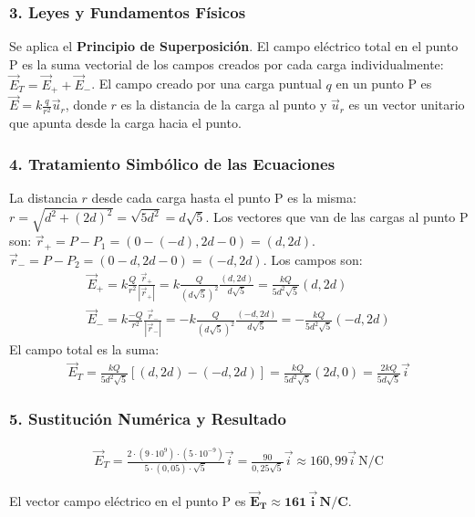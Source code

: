 \subsubsection*{3. Leyes y Fundamentos Físicos}
Se aplica el \textbf{Principio de Superposición}. El campo eléctrico total en el punto P es la suma vectorial de los campos creados por cada carga individualmente: $\vec{E}_T = \vec{E}_+ + \vec{E}_-$.
El campo creado por una carga puntual $q$ en un punto P es $\vec{E} = k \frac{q}{r^2} \vec{u}_r$, donde $r$ es la distancia de la carga al punto y $\vec{u}_r$ es un vector unitario que apunta desde la carga hacia el punto.

\subsubsection*{4. Tratamiento Simbólico de las Ecuaciones}
La distancia $r$ desde cada carga hasta el punto P es la misma: $r = \sqrt{d^2 + (2d)^2} = \sqrt{5d^2} = d\sqrt{5}$.
Los vectores que van de las cargas al punto P son:
$\vec{r}_+ = P - P_1 = (0 - (-d), 2d - 0) = (d, 2d)$.
$\vec{r}_- = P - P_2 = (0 - d, 2d - 0) = (-d, 2d)$.
Los campos son:
\begin{gather}
    \vec{E}_+ = k \frac{Q}{r^2} \frac{\vec{r}_+}{|\vec{r}_+|} = k \frac{Q}{(d\sqrt{5})^2} \frac{(d, 2d)}{d\sqrt{5}} = \frac{kQ}{5d^2\sqrt{5}} (d, 2d) \\
    \vec{E}_- = k \frac{-Q}{r^2} \frac{\vec{r}_-}{|\vec{r}_-|} = -k \frac{Q}{(d\sqrt{5})^2} \frac{(-d, 2d)}{d\sqrt{5}} = -\frac{kQ}{5d^2\sqrt{5}} (-d, 2d)
\end{gather}
El campo total es la suma:
\begin{gather}
    \vec{E}_T = \frac{kQ}{5d^2\sqrt{5}} \left[ (d, 2d) - (-d, 2d) \right] = \frac{kQ}{5d^2\sqrt{5}} (2d, 0) = \frac{2kQ}{5d\sqrt{5}} \vec{i}
\end{gather}

\subsubsection*{5. Sustitución Numérica y Resultado}
\begin{gather}
    \vec{E}_T = \frac{2 \cdot (9\cdot10^9) \cdot (5\cdot10^{-9})}{5 \cdot (0,05) \cdot \sqrt{5}} \vec{i} = \frac{90}{0,25\sqrt{5}} \vec{i} \approx 160,99 \vec{i} \, \text{N/C}
\end{gather}
\begin{cajaresultado}
    El vector campo eléctrico en el punto P es $\boldsymbol{\vec{E}_T \approx 161 \, \vec{i} \, \textbf{N/C}}$.
\end{cajaresultado}

